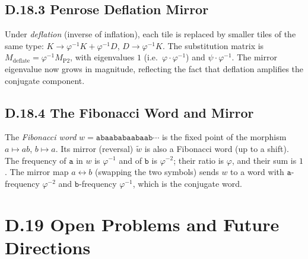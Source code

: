 \subsection*{D.18.3  Penrose Deflation Mirror}

Under \emph{deflation} (inverse of inflation), each tile is replaced by smaller
tiles of the same type:
$K \to \varphi^{-1} K + \varphi^{-1} D$, $D \to \varphi^{-1} K$.
The substitution matrix is $M_{\mathrm{deflate}} = \varphi^{-1} M_{\mathrm{P2}}$,
with eigenvalues $1$ (i.e.\ $\varphi \cdot \varphi^{-1}$) and $\psi\cdot\varphi^{-1}$.
The mirror eigenvalue now grows in magnitude, reflecting the fact that deflation
amplifies the conjugate component.

\subsection*{D.18.4  The Fibonacci Word and Mirror}

The \emph{Fibonacci word} $w = \mathtt{abaababaabaab\cdots}$ is the fixed point
of the morphism $a\mapsto ab$, $b\mapsto a$.
Its mirror (reversal) $\tilde w$ is also a Fibonacci word (up to a shift).
The frequency of $\mathtt{a}$ in $w$ is $\varphi^{-1}$ and of $\mathtt{b}$ is
$\varphi^{-2}$; their ratio is $\varphi$, and their sum is $1$.
The mirror map $a\leftrightarrow b$ (swapping the two symbols) sends $w$ to
a word with $\mathtt{a}$-frequency $\varphi^{-2}$ and $\mathtt{b}$-frequency $\varphi^{-1}$,
which is the conjugate word.

\section*{D.19  Open Problems and Future Directions}

